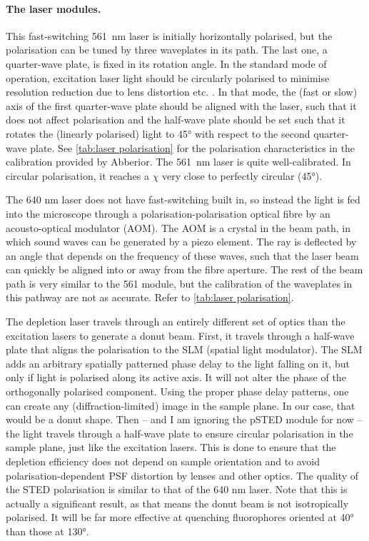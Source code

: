 \paragraph{The laser modules.} This fast-switching 561~nm laser is initially horizontally polarised, but the polarisation can be tuned by three waveplates in its path. The last one, a quarter-wave plate, is fixed in its rotation angle. In the standard mode of operation, excitation laser light should be circularly polarised to minimise resolution reduction due to lens distortion etc. \cite{Harke2008}. In that mode, the (fast or slow) axis of the first quarter-wave plate should be aligned with the laser, such that it does not affect polarisation and the half-wave plate should be set such that it rotates the (linearly polarised) light to \ang{45} with respect to the second quarter-wave plate. See \autoref{tab:laser polarisation} for the polarisation characteristics in the calibration provided by Abberior. The 561~nm laser is quite well-calibrated. In circular polarisation, it reaches a $ \chi $ very close to perfectly circular (\ang{45}).

The 640 nm laser does not have fast-switching built in, so instead the light is fed into the microscope through a polarisation-polarisation optical fibre by an acousto-optical modulator (AOM). The AOM is a crystal in the beam path, in which sound waves can be generated by a piezo element. The ray is deflected by an angle that depends on the frequency of these waves, such that the laser beam can quickly be aligned into or away from the fibre aperture. The rest of the beam path is very similar to the 561 module, but the calibration of the waveplates in this pathway are not as accurate. Refer to \autoref{tab:laser polarisation}. 

The depletion laser travels through an entirely different set of optics than the excitation lasers to generate a donut beam. First, it travels through a half-wave plate that aligns the polarisation to the SLM (spatial light modulator). The SLM adds an arbitrary spatially patterned phase delay to the light falling on it, but only if light is polarised along its active axis. It will not alter the phase of the orthogonally polarised component. Using the proper phase delay patterns, one can create any (diffraction-limited) image in the sample plane. In our case, that would be a donut shape. Then -- and I am ignoring the pSTED module for now -- the light travels through a half-wave plate to ensure circular polarisation in the sample plane, just like the excitation lasers. This is done to ensure that the depletion efficiency does not depend on sample orientation and to avoid polarisation-dependent PSF distortion by lenses and other optics. The quality of the STED polarisation is similar to that of the 640 nm laser. Note that this is actually a significant result, as that means the donut beam is not isotropically polarised. It will be far more effective at quenching fluorophores oriented at \ang{40} than those at \ang{130}.

